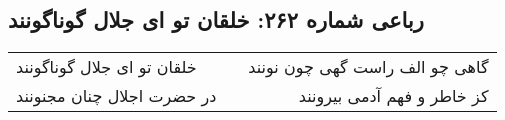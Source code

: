 \begin{center}
\section*{رباعی شماره ۲۶۲: خلقان تو ای جلال گوناگونند}
\label{sec:sh262}
\begin{longtable}{l p{0.5cm} r}
خلقان تو ای جلال گوناگونند
&&
گاهی چو الف راست گهی چون نونند
\\
در حضرت اجلال چنان مجنونند
&&
کز خاطر و فهم آدمی بیرونند
\\
\end{longtable}
\end{center}
